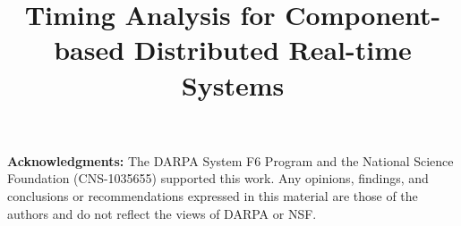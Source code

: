 \documentclass[10pt,conference]{IEEEtran}
\begin{document}
\title{ Timing Analysis for Component-based Distributed Real-time Systems }
\vspace{-0.1in}
\author{ 
}


\setcounter{page}{1}
\maketitle










\textbf{Acknowledgments:} The DARPA System F6 Program and the National
Science Foundation (CNS-1035655) supported
this work. Any opinions, findings, and conclusions or recommendations expressed
in this material are those of the authors and do not reflect the views of
DARPA or NSF. 
\balance
\begin{spacing}{0.88}


\end{spacing}
\end{document}
